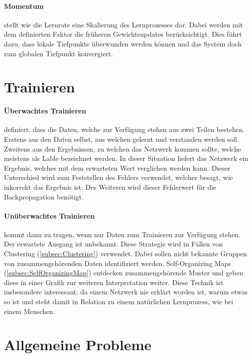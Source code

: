 \paragraph{Momentum} stellt wie die Lernrate eine Skalierung des Lernprozesses dar.
Dabei werden mit dem definierten Faktor die früheren Gewichtsupdates berücksichtigt. 
Dies führt dazu, dass lokale Tiefpunkte überwunden werden können und das System doch zum globalen Tiefpunkt konvergiert.

\section{Trainieren}

\paragraph{Überwachtes Trainieren} definiert, dass die Daten, welche zur Verfügung stehen aus zwei Teilen bestehen.
Erstens aus den Daten selbst, aus welchen gelernt und verstanden werden soll.
Zweitens aus den Ergebnissen, zu welchen das Netzwerk kommen sollte, welche meistens als Lable bezeichnet werden. 
In dieser Situation liefert das Netzwerk ein Ergebnis, welches mit dem erwarteten Wert verglichen werden kann.
Dieser Unterschied wird zum Feststellen des Fehlers verwendet, welcher besagt, wie inkorrekt das Ergebnis ist.
Des Weiteren wird dieser Fehlerwert für die Backpropagation benötigt.

\paragraph{Unüberwachtes Trainieren} kommt dann zu tragen, wenn nur Daten zum Trainieren zur Verfügung stehen.
Der erwartete Ausgang ist unbekannt.
Diese Strategie wird in Fällen von Clustering (\ref{subsec:Clustering}) verwendet.
Dabei sollen nicht bekannte Gruppen von zusammengehörenden Daten identifiziert werden. 
Self-Organizing Maps (\ref{subsec:SelfOrganizingMap}) entdecken zusammengehörende Muster und geben diese in einer Grafik zur weiteren Interpretation weiter. 
Diese Technik ist insbesondere interessant, da einem Netzwerk nie erklärt worden ist, warum etwas so ist und steht damit in Relation zu einem natürlichen Lernprozess, wie bei einem Menschen.

\section{Allgemeine Probleme}
\label{sec:AllgeProb}

